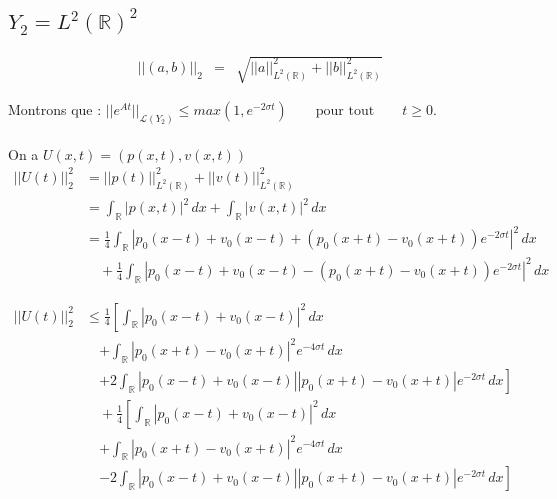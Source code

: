 \documentclass[a4paper,11pt]{article}
\begin{document}

\subsection{\( Y_{2} = L^{2}(\mathbb{R})^{2} \)}

\begin{equation*}
\begin{array}{rcl}
    ||(a,b)||_{2} &=& \sqrt{||a||^{2}_{L^{2}(\mathbb{R})} + ||b||^{2}_{L^{2}(\mathbb{R})}}
\end{array}
\end{equation*}

Montrons que :
\( ||e^{At}||_{\mathcal{L}(Y_2)}\leq max(1, e^{-2\sigma t}) \qquad \mbox{pour tout} \qquad t\geq 0. \)\\ \\
On a \( U(x,t)=(p(x,t),v(x,t)) \) \\

\begin{equation*}
\begin{split}
    ||U(t)||^{2}_{2} &= ||p(t)||^{2}_{L^{2}(\mathbb{R})} + ||v(t)||^{2}_{L^{2}(\mathbb{R})} \\
    &= \int_{\mathbb{R}}{|p(x,t)|^{2}\,dx} + \int_{\mathbb{R}}{|v(x,t)|^{2}\,dx} \\
    &= \frac{1}{4} \int_{\mathbb{R}} |p_0(x-t)+v_0(x-t) + (p_0(x+t)-v_0(x+t)) e^{-2\sigma t} |^{2} \,dx \\
    & \quad +\frac{1}{4} \int_{\mathbb{R}} |p_0(x-t) + v_0(x-t) - (p_0(x+t) - v_0(x+t)) e^{-2\sigma t}|^{2} \,dx 
\end{split}
\end{equation*}

\begin{equation*}
\begin{split}
    ||U(t)||^{2}_{2} & \le \frac{1}{4} \left[ \int_{\mathbb{R}}|p_0(x-t) + v_0(x-t)|^{2} \,dx \right. \\
   & \quad \left. + \int_{\mathbb{R}} |p_0(x+t) - v_0(x+t)|^{2}  e^{-4\sigma t} \,dx \right. \\
   & \quad \left. + 2 \int_{\mathbb{R}} |p_0(x-t) + v_0(x-t)| |p_0(x+t) - v_0(x+t)| e^{-2\sigma t} \,dx \right] \\
   & \quad + \frac{1}{4} \left[ \int_{\mathbb{R}}|p_0(x-t) + v_0(x-t)|^{2} \,dx \right. \\
   & \quad \left. + \int_{\mathbb{R}} |p_0(x+t) - v_0(x+t)|^{2}  e^{-4\sigma t} \,dx \right. \\
   & \quad \left. - 2 \int_{\mathbb{R}} |p_0(x-t) + v_0(x-t)| |p_0(x+t) - v_0(x+t)| e^{-2\sigma t} \,dx \right]
\end{split}
\end{equation*}
\end{document}
